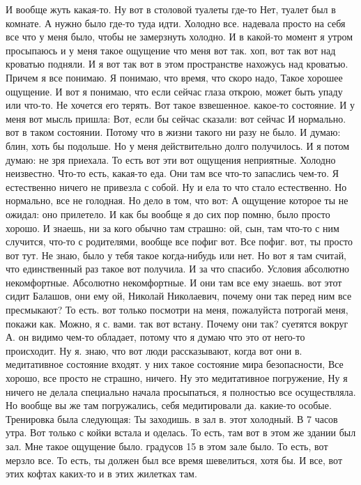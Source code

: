 И вообще жуть какая-то.
Ну вот в столовой туалеты где-то Нет, туалет был в комнате.
А нужно было где-то туда идти.
Холодно все.
надевала просто на себя все что у меня было, чтобы не замерзнуть холодно. И в какой-то момент я утром просыпаюсь и у меня такое ощущение что
меня вот так.
хоп, вот так вот над кроватью подняли.
И я вот так вот в этом пространстве нахожусь над кроватью.
Причем я все понимаю.
Я понимаю, что время, что скоро надо, Такое хорошее ощущение.
И вот я понимаю, что если сейчас глаза открою, может быть упаду или что-то.
Не хочется его терять.
Вот такое взвешенное.
какое-то состояние.
И у меня вот мысль пришла:
Вот, если бы сейчас сказали: вот сейчас И нормально. вот в таком состоянии.
Потому что в жизни такого ни разу не было.
И думаю: блин, хоть бы подольше.
Но у меня действительно долго получилось.
И я потом думаю: не зря приехала.
То есть вот эти вот ощущения неприятные.
Холодно неизвестно.
Что-то есть, какая-то еда.
Они там все что-то запаслись чем-то.
Я естественно ничего не привезла с собой.
Ну и ела то что стало естественно.
Но нормально, все не голодная.
Но дело в том, что вот:
А ощущение которое ты не ожидал: оно прилетело.
И как бы вообще я до сих пор помню, было просто хорошо.
И знаешь, ни за кого обычно там страшно: ой, сын, там что-то с ним случится, что-то с родителями, вообще все пофиг вот.
Все пофиг. вот, ты просто вот тут.
Не знаю, было у тебя такое когда-нибудь или нет.
Но вот я там считай, что единственный раз такое вот получила.
И за что спасибо.
Условия абсолютно некомфортные.
Абсолютно некомфортные.
И они там все ему знаешь. вот этот сидит Балашов, они ему ой, Николай Николаевич, почему они так перед ним все пресмыкают?
То есть. вот только посмотри на меня, пожалуйста потрогай меня, покажи как.
Можно, я с. вами.
так вот встану. Почему они так?
суетятся вокруг А.
он видимо чем-то обладает, потому что я думаю что
это от него-то происходит. Ну я.
знаю, что вот люди рассказывают, когда вот они в.
медитативное состояние входят.
у них такое состояние мира безопасности, Все хорошо, все просто не страшно, ничего. Ну это медитативное погружение, Ну я ничего не делала специально начала просыпаться, я полностью все осуществляла. Но вообще вы же там погружались, себя медитировали да.
какие-то особые. Тренировка была следующая: Ты заходишь.
в зал в.
этот холодный.
В 7 часов утра.
Вот только с койки встала и оделась.
То есть, там вот в этом же здании был зал.
Мне такое ощущение было. градусов 15 в этом зале было.
То есть, вот мерзло все.
То есть, ты должен был все время шевелиться, хотя бы.
И все, вот этих кофтах каких-то и в этих жилетках там.
